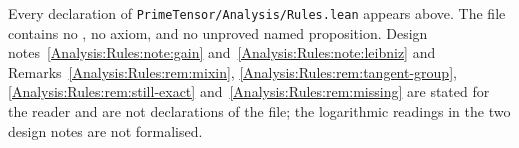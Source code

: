 \noindent
Every declaration of \texttt{PrimeTensor/Analysis/Rules.lean} appears above.
The file contains no , no axiom, and no unproved named proposition.
Design notes~\ref{Analysis:Rules:note:gain}
and~\ref{Analysis:Rules:note:leibniz} and
Remarks~\ref{Analysis:Rules:rem:mixin},
\ref{Analysis:Rules:rem:tangent-group},
\ref{Analysis:Rules:rem:still-exact} and~\ref{Analysis:Rules:rem:missing} are
stated for the reader and are not declarations of the file; the logarithmic
readings in the two design notes are not formalised.
